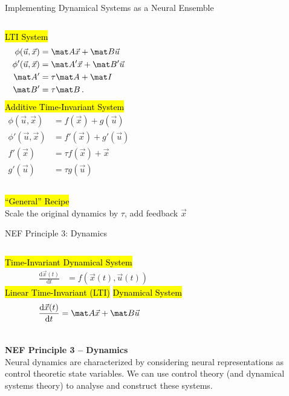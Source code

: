 \documentclass[handout,aspectratio=169]{beamer}
\begin{document}
	\begin{frame}{Implementing Dynamical Systems as a Neural Ensemble}
		\begin{columns}[t]
			\centering
			\hl{LTI System}
			\begin{align*}
				\phi(\vec u, \vec x) &= \mat A \vec x + \mat B \vec u \\
				\phi'(\vec u, \vec x) &= \mat A' \vec x + \mat B' \vec u \\
				\mat A' &= \tau \mat A + \mat I \\ \mat B' &= \tau \mat B \,.
			\end{align*}
			\centering
			\hl{Additive Time-Invariant System}
			\begin{align*}
				\phi(\vec u, \vec x) &= f(\vec x) + g(\vec u) \\
				\phi'(\vec u, \vec x) &= f'(\vec x) + g'(\vec u) \\
				f'(\vec x) &= \tau f(\vec x) + \vec x \\
				g'(\vec u) &= \tau g(\vec u)
			\end{align*}
		\end{columns}
		\vspace{1cm}
		\centering \hl{\enquote{General} Recipe}\\[0.25cm]
		Scale the original dynamics by $\tau$, add feedback $\vec x$
	\end{frame}

	\begin{frame}{NEF Principle 3: Dynamics}
	\begin{columns}[b]
		\centering
		\hl{Time-Invariant Dynamical System}\\
		\begin{align*}
			\frac{\mathrm{d}\vec x(t)}{\mathrm{d}t} &= f(\vec x(t), \vec u(t))
		\end{align*}
		\centering
		\hl{Linear Time-Invariant (LTI)}
		\hl{Dynamical System}
		\begin{align*}
			\frac{\mathrm{d}\vec x(t)}{\mathrm{d}t} &= \mat A \vec x + \mat B \vec u
		\end{align*}
	\end{columns}
	\vspace{0.75cm}
	\begin{mdframed}
		\textbf{NEF Principle 3 -- Dynamics}\\
		Neural dynamics are characterized by considering neural representations as control theoretic state variables. We can use control theory (and dynamical systems theory) to analyse and construct these systems.
	\end{mdframed}
\end{frame}
\end{document}
